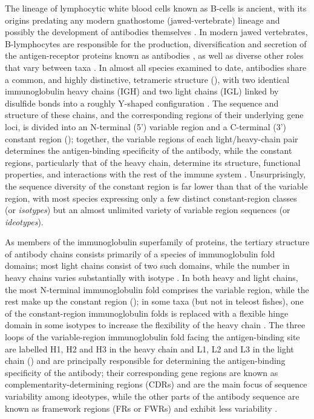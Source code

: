 The lineage of lymphocytic white blood cells known as B-cells is ancient, with its origins predating any modern gnathostome (jawed-vertebrate) lineage and possibly the development of antibodies themselves \parencite{boehm2011design,kasahara2015vlr}. In modern jawed vertebrates, B-lymphocytes are responsible for the production, diversification and secretion of the antigen-receptor proteins known as antibodies \parencite{mix2006immunoglobulins,schroeder2010immunoglobulins}, as well as diverse other roles that vary between taxa \parencite{sunyer2013fishing}. In almost all species examined to date, antibodies share a common, and highly distinctive, tetrameric structure (), with two identical immunoglobulin heavy chains (IGH) and two light chains (IGL) linked by disulfide bonds into a roughly Y-shaped configuration \parencite{mix2006immunoglobulins,schroeder2010immunoglobulins}. The sequence and structure of these chains, and the corresponding regions of their underlying gene loci, is divided into an N-terminal (5') variable region and a C-terminal (3') constant region \parencite{mix2006immunoglobulins} (); together, the variable regions of each light/heavy-chain pair determines the antigen-binding specificity of the antibody, while the constant regions, particularly that of the heavy chain, determine its structure, functional properties, and interactions with the rest of the immune system \parencite{mix2006immunoglobulins,schroeder2010immunoglobulins}. Unsurprisingly, the sequence diversity of the constant region is far lower than that of the variable region, with most species expressing only a few distinct constant-region classes (or \textit{isotypes}) but an almost unlimited variety of variable region sequences (or \textit{ideotypes}).

As members of the immunoglobulin superfamily of proteins, the tertiary structure of antibody chains consists primarily of a species of immunoglobulin fold domains; most light chains consist of two such domains, while the number in heavy chains varies substantially with isotype \parencite{schroeder2010immunoglobulins}. In both heavy and light chains, the most N-terminal immunoglobulin fold comprises the variable region, while the rest make up the constant region (); in some taxa (but not in teleost fishes), one of the constant-region immunoglobulin folds is replaced with a flexible hinge domain in some isotypes to increase the flexibility of the heavy chain \parencite{schroeder2010immunoglobulins}. The three loops of the variable-region immunoglobulin fold facing the antigen-binding site are labelled H1, H2 and H3 in the heavy chain and L1, L2 and L3 in the light chain () and are principally responsible for determining the antigen-binding specificity of the antibody; their corresponding gene regions are known as complementarity-determining regions (CDRs) and are the main focus of sequence variability among ideotypes, while the other parts of the antibody sequence are known as framework regions (FRs or FWRs) and exhibit less variability \parencite{schroeder2010immunoglobulins}.

